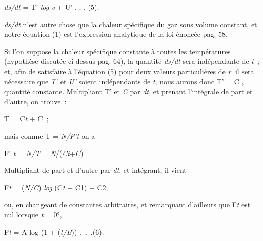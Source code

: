\documentclass[french,twoside]{book} %
\begin{document}
{\begin{center}
\noindent \emph{ds/dt} = T’ \emph{log v} + U’ . . . (5).\par
\end{center}

 \noindent \emph{ds/dt} n’est autre chose que la chaleur spécifique du gaz sous volume constant, et notre équation (1) est l’expression analytique de la loi énoncée pag. 58.\par
 Si l’on suppose la chaleur spécifique constante à toutes les températures (hypothèse discutée ci-dessus pag. 64), la quantité \emph{ds/dt} sera indépendante de \emph{t} ; et, afin de satisfaire à l’équation (5) pour deux valeurs particulières de \emph{r}. il sera nécessaire que \emph{T’} et \emph{U’} soient indépendants de \emph{t}, nous aurons donc T’ = C , quantité constante. Multipliant T’ et \emph{C} par \emph{dt}, et prenant l’intégrale de part et d’autre, on trouve :\par
 
\begin{center}
\noindent T = C\emph{t} + C ;\par
\end{center}

 \noindent mais comme T = \emph{N/F’t} on a\par
 
\begin{center}
\noindent F’ \emph{t} = \emph{N/T} = \emph{N}/(\emph{Ct}+\emph{C})\par
\end{center}

 \noindent Multipliant de part et d’autre par \emph{dt}, et intégrant, il vient\par
 
\begin{center}
\noindent F\emph{t} = (\emph{N/C}) \emph{log} (C\emph{t} + C1) + C2;\par
\end{center}

 \noindent ou, en changeant de constantes arbitraires, et remarquant d’ailleurs que F\emph{t} est nul lorsque \emph{t} = 0°,\par
 
\begin{center}
\noindent F\emph{t} = A log (1 + (\emph{t/B})) . . .(6).\par
\end{center}

}
\end{document}
